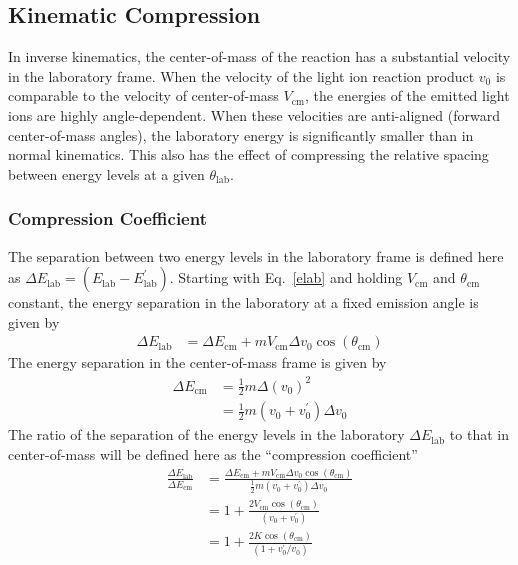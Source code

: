 \subsection{Kinematic Compression}
\label{kin_comp}
In inverse kinematics, the center-of-mass of the reaction has a substantial velocity in the laboratory frame.  When the velocity of the light ion reaction product $v_0$ is comparable to the velocity of center-of-mass $V_\mathrm{cm}$, the energies of the emitted light ions are highly angle-dependent.  When these velocities are anti-aligned (forward center-of-mass angles), the laboratory energy is significantly smaller than in normal kinematics.  This also has the effect of compressing the relative spacing between energy levels at a given $\theta_\mathrm{lab}$.

\subsubsection{Compression Coefficient}
The separation between two energy levels in the laboratory frame is defined here as $\Delta E_\mathrm{lab}=(E_\mathrm{lab}-E_\mathrm{lab}^\prime)$.  Starting with Eq.~\ref{elab} and holding $V_\mathrm{cm}$ and $\theta_\mathrm{cm}$ constant, the energy separation in the laboratory at a fixed emission angle is given by
\begin{equation}
\begin{split}
\Delta E_\mathrm{lab}
&=\Delta E_\mathrm{cm}+mV_\mathrm{cm}\Delta v_0 \cos(\theta_\mathrm{cm})
\end{split}
\label{eq:delta_e2}
\end{equation}
The energy separation in the center-of-mass frame is given by
\begin{equation}
\begin{split}
\Delta E_\mathrm{cm}
&=\frac{1}{2}m \Delta (v_0)^2\\
&=\frac{1}{2}m (v_0+v_0^\prime)\Delta v_0
\end{split}
\label{eq:delta_ecm}
\end{equation}
The ratio of the separation of the energy levels in the laboratory $\Delta E_\mathrm{lab}$ to that in center-of-mass will be defined here as the ``compression coefficient''
\begin{equation}
\begin{split}
\frac{\Delta E_\mathrm{lab}}{\Delta E_\mathrm{cm}}
&=\frac{\Delta E_\mathrm{cm}+mV_\mathrm{cm}\Delta v_0 \cos(\theta_\mathrm{cm})}{\frac{1}{2}m (v_0+v_0^\prime)\Delta v_0}\\
&=1+\frac{2V_\mathrm{cm}\cos(\theta_\mathrm{cm})}{(v_0+v_0^\prime)}\\
&=1+\frac{2 K \cos(\theta_\mathrm{cm})}{(1+v_0^\prime/v_0)}
\end{split}
\label{eq:compress}
\end{equation}
